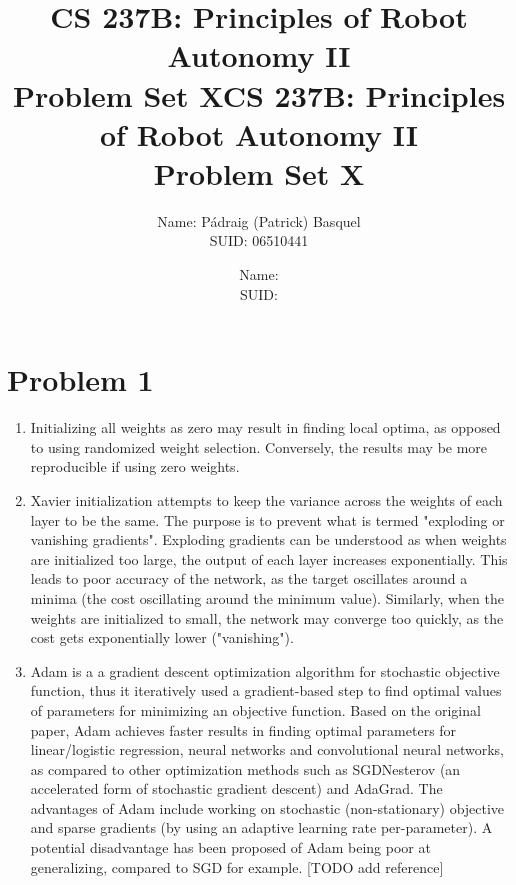 \documentclass{article}
\title{CS 237B: Principles of Robot Autonomy II \\ Problem Set X}
\author{Name: Pádraig (Patrick) Basquel      \\ SUID: 06510441}
\date{}
\title{CS 237B: Principles of Robot Autonomy II \\ Problem Set X}
\author{Name:      \\ SUID:}
\date{}
\begin{document}
\maketitle
\pagestyle{fancy} 


\section*{Problem 1}
\begin{enumerate}[label=(\roman*)]
\item Initializing all weights as zero may result in finding local optima, as opposed to using randomized weight selection. Conversely, the results may be more reproducible if using zero weights.
\item Xavier initialization attempts to keep the variance across the weights of each layer to be the same. The purpose is to prevent what is termed "exploding or vanishing gradients". Exploding gradients can be understood as when weights are initialized too large, the output of each layer increases exponentially. This leads to poor accuracy of the network, as the target oscillates around a minima (the cost oscillating around the minimum value). Similarly, when the weights are initialized to small, the network may converge too quickly, as the cost gets exponentially lower ("vanishing").
\item Adam is a a gradient descent optimization algorithm for stochastic objective function, thus it iteratively used a gradient-based step to find optimal values of parameters for minimizing an objective function. Based on the original paper, Adam achieves faster results in finding optimal parameters for linear/logistic regression, neural networks and convolutional neural networks, as compared to other optimization methods such as SGDNesterov (an accelerated form of stochastic gradient descent) and AdaGrad. The advantages of Adam include working on stochastic (non-stationary) objective and sparse gradients (by using an adaptive learning rate per-parameter). A potential disadvantage has been proposed of Adam being poor at generalizing, compared to SGD for example. [TODO add reference]

\end{enumerate}

\end{document}
